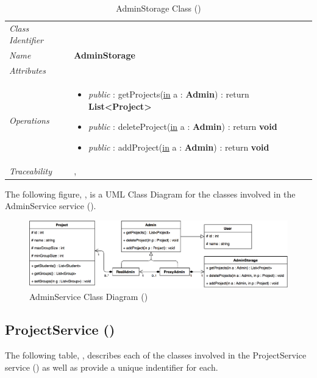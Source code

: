 \documentclass[12pt,letterpaper]{article}
\begin{document}
\begin{table}[H]
    \caption{AdminStorage Class ()} 
	\begin{tabu} to 
		\toprule
		Class Identifier &  \\
		Name & {\bf AdminStorage} \\
		Attributes & \\

		Operations &
		\begin{minipage}[t]{\linewidth}
			\begin{itemize}
			    \item {\it public} : getProjects(\underline{in} a : {\bf Admin}) : return {\bf List<Project>}
			    \item {\it public} : deleteProject(\underline{in} a : {\bf Admin}) : return {\bf void}
			    \item {\it public} : addProject(\underline{in} a : {\bf Admin}) : return {\bf void}
	        \end{itemize}
	    \end{minipage} \\
	    	Traceability & , \\
		\toprule
	\end{tabu}
\end{table}

\newpage{}
The following figure, , is a UML Class Diagram for the classes involved in the AdminService service ().

\begin{figure}[H]
	\centering{}
	\includegraphics[scale=0.27]{imgs/d3/interfaces/admin.png}
	\caption{AdminService Class Diagram ()}
\end{figure}

\subsection{ProjectService ()}

The following table, , describes each of the classes involved in the ProjectService service () as well as provide a unique indentifier for each.
\end{document}
